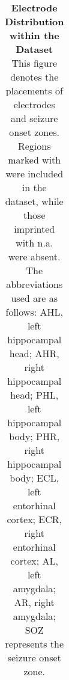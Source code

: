 \documentclass[preprint,review,12pt]{elsarticle}%
\providecommand{\DIFaddtex}[1]{{\protect\color{blue}\uwave{#1}}} %
\providecommand{\DIFaddbegin}{} %
\providecommand{\DIFaddend}{} %
\providecommand{\DIFdelend}{} %
\providecommand{\DIFaddFL}[1]{\DIFadd{#1}} %
\providecommand{\DIFaddbeginFL}{} %
\providecommand{\DIFaddendFL}{} %
\providecommand{\DIFdelbeginFL}{} %
\providecommand{\DIFdelendFL}{} %
\providecommand{\DIFadd}[1]{\texorpdfstring{\DIFaddtex{#1}}{#1}} %
\newcommand{\DIFscaledelfig}{0.5}
\newlength{\DIFdelgraphicswidth} %
\newlength{\DIFdelgraphicsheight} %
\newcommand{\DIFaddincludegraphics}[2][]{{\color{blue}\fbox{\DIFOincludegraphics[#1]{#2}}}} %
\newcommand{\DIFdelincludegraphics}[2][]{%
\sbox{\DIFdelgraphicsbox}{\DIFOincludegraphics[#1]{#2}}%
\settoboxwidth{\DIFdelgraphicswidth}{\DIFdelgraphicsbox} %
\settoboxtotalheight{\DIFdelgraphicsheight}{\DIFdelgraphicsbox} %
\scalebox{\DIFscaledelfig}{%
\parbox[b]{\DIFdelgraphicswidth}{\usebox{\DIFdelgraphicsbox}\\[-\baselineskip] \rule{\DIFdelgraphicswidth}{0em}}\llap{\resizebox{\DIFdelgraphicswidth}{\DIFdelgraphicsheight}{%
\setlength{\unitlength}{\DIFdelgraphicswidth}%
\begin{picture}(1,1)%
\thicklines\linethickness{2pt} %
{\color[rgb]{1,0,0}\put(0,0){\framebox(1,1){}}}%
{\color[rgb]{1,0,0}\put(0,0){\line( 1,1){1}}}%
{\color[rgb]{1,0,0}\put(0,1){\line(1,-1){1}}}%
\end{picture}%
}\hspace*{3pt}}} %
} %
\DeclareRobustCommand{\DIFaddbegin}{\DIFOaddbegin \let\includegraphics\DIFaddincludegraphics} %
\DeclareRobustCommand{\DIFaddend}{\DIFOaddend \let\includegraphics\DIFOincludegraphics} %
\DeclareRobustCommand{\DIFdelend}{\DIFOaddend \let\includegraphics\DIFOincludegraphics} %
\DeclareRobustCommand{\DIFaddbeginFL}{\DIFOaddbeginFL \let\includegraphics\DIFaddincludegraphics} %
\DeclareRobustCommand{\DIFaddendFL}{\DIFOaddendFL \let\includegraphics\DIFOincludegraphics} %
\DeclareRobustCommand{\DIFdelbeginFL}{\DIFOdelbeginFL \let\includegraphics\DIFdelincludegraphics} %
\DeclareRobustCommand{\DIFdelendFL}{\DIFOaddendFL \let\includegraphics\DIFOincludegraphics} %
\begin{document}
\begin{table}[htbp]
\begin{tabular}{*{11}{r}}
{}\DIFdelendFL \DIFaddbeginFL \DIFaddFL{$\mathrm{ECR\ \&\ AR}$}\DIFaddendFL \\
\bottomrule
\end{tabular}
\captionsetup{width=\textwidth}
\caption{\textbf{
Electrode Distribution within the Dataset
}
\smallskip
\\
This figure denotes the placements of electrodes and seizure onset zones. Regions marked with \checkmark were included in the dataset, while those imprinted with n.a. were absent. The abbreviations used are as follows: AHL, left hippocampal head; AHR, right hippocampal head; PHL, left hippocampal body; PHR, right hippocampal body; ECL, left entorhinal cortex; ECR, right entorhinal cortex; AL, left amygdala; AR, right amygdala; SOZ represents the seizure onset zone.
}
\DIFdelbeginFL %
\DIFdelend %
\DIFaddbegin \end{table}

\DIFaddend \restoregeometry
\DIFaddbegin 
\end{document}
